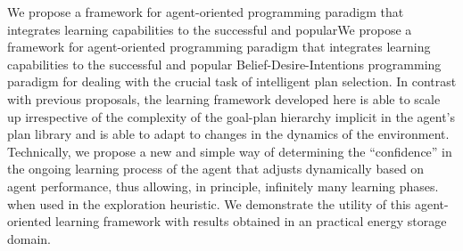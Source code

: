 


We propose a framework for agent-oriented programming paradigm that integrates learning capabilities to the successful and popularWe propose a framework for agent-oriented programming paradigm that integrates learning capabilities to the successful and popular Belief-Desire-Intentions programming paradigm for dealing with the crucial task of intelligent plan selection.
In contrast with previous proposals, the learning framework developed here is able to scale up irrespective of the complexity of the goal-plan hierarchy implicit in the agent's plan library and is able to adapt to changes in the dynamics of the environment.
Technically, we propose a new and simple way of determining the ``confidence'' in the ongoing learning process of the agent that adjusts dynamically based on agent performance, thus allowing, in principle, infinitely many learning phases. when used in the exploration heuristic. 
%
We demonstrate the utility of this agent-oriented learning framework with results obtained in an practical energy storage domain.


% 
% 
% 
